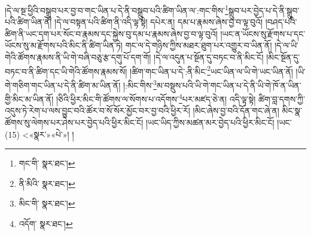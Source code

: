 །དེ་ལ་སྔ་ཕྱིའི་བསྒྲུབ་པར་བྱ་བ་གང་ཡིན་པ་དེ་ནི་བསྒྲུབ་པའི་ཚིག་ཡིན་ལ་:གང་གིས་\footnote{གང་གི་  སྣར་ཐང་། }སྒྲུབ་པར་བྱེད་པ་དེ་ནི་སྒྲུབ་པའི་ཚིག་ཡིན་ནོ། །དེ་ལ་བསྟན་པའི་ཚིག་ནི་འདི་ལྟ་སྟེ། དཔེར་ན། དམ་པ་རྣམས་ཞེས་བྱ་བ་ལྟ་བུའོ། །བཤད་པའི་ཚིག་ནི་ཡང་དག་པར་སོང་བ་རྣམས་དང་སྐྱེས་བུ་དམ་པ་རྣམས་ཞེས་བྱ་བ་ལྟ་བུའོ། །ཡང་ན་ཡོངས་སུ་རྫོགས་པ་དང་ཡོངས་སུ་མ་རྫོགས་པའི་མིང་ནི་ཚིག་ཡིན་ཏེ། གང་ལ་དེ་གཉིས་ཀྱིས་མཐར་ཐུག་པར་འགྱུར་བ་ཡིན་ནོ། །དེ་ལ་ཡི་གེའི་ཚོགས་རྣམས་ནི་ཡི་གེ་བཞི་བཅུ་རྩ་དགུ་པོ་དག་གོ། །དེ་ལ་འདུན་པ་སྔོན་དུ་བཏང་བ་ནི་མིང་ངོ། །མིང་སྔོན་དུ་བཏང་བ་ནི་ཚིག་དང་ཡི་གེའི་ཚོགས་རྣམས་སོ། །ཚིག་གང་ཡིན་པ་དེ་:ནི་མིང་\footnote{ནི་མིའི་  སྣར་ཐང་། }ཡང་ཡིན་ལ་ཡི་གེ་ཡང་ཡིན་ནོ། །ཡི་གེ་གཅིག་གང་ཡིན་པ་དེ་ནི་ཚིག་མ་ཡིན་ནོ། །:མིང་གིས་\footnote{མིང་གི་  སྣར་ཐང་། }མ་བསྡུས་པའི་ཡི་གེ་གང་ཡིན་པ་དེ་ནི་ཡི་གེ་ཁོ་ན་ཡིན་གྱི་མིང་མ་ཡིན་ནོ། །ཅིའི་ཕྱིར་མིང་གི་ཚོགས་ལ་སོགས་པ་འདོགས་\footnote{འདོག་  སྣར་ཐང་། }པར་མཛད་ཅེ་ན། འདི་ལྟ་སྟེ། ཚིག་བླ་དགས་ཀྱི་འདུས་ཏེ་རེག་པ་ལས་བྱུང་བའི་ཚོར་བ་སོ་སོར་མྱོང་བར་བྱ་བའི་ཕྱིར་རོ། །མིང་ཞེས་བྱ་བའི་དོན་གང་ཞེ་ན། མིང་སྣ་ཚོགས་སུ་ལེགས་པར་ཤེས་པར་བྱེད་པའི་ཕྱིར་མིང་ངོ། །ཡང་ཡིད་ཀྱིས་མཚན་མར་བྱེད་པའི་ཕྱིར་མིང་ངོ། །ཡང་(15) <«སྣར་»«པེ་»། །
